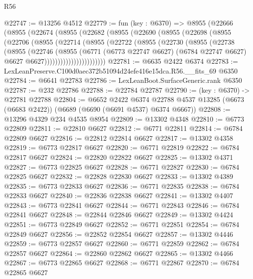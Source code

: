 \begin{lexlean}{R56}
\begin{coremodule}
@22747 := @13256 @4512
@22779 := fun (key : @6370) =>
  @8955
    (@22666
      (@8955
        (@22674
          (@8955
            (@22682
              (@8955
                (@22690
                  (@8955
                    (@22698
                      (@8955
                        (@22706
                          (@8955
                            (@22714
                              (@8955
                                (@22722
                                  (@8955
                                    (@22730
                                      (@8955
                                        (@22738
                                          (@8955
                                            (@22746
                                              (@8955
                                                (@6771
                                                  (@6773 @22747 @6627)
                                                  (@6784 @22747 @6627)
                                                  @6627
                                                  @6627)))))))))))))))))))))))
@22781 := @6635 @2422 @6374
@22783 := LexLeanPreserve.C100d0aec372b51094d24efe416e15dca.R56.__fits_69 @6350
@22784 := @6641 @22783
@22786 := LexLeanBoot.SurfaceGeneric.rank @6350
@22787 := @232 @22786
@22788 := @22784 @22787
@22790 := (key : @6370) -> @22781 @22788
@22804 := @6652
    @2422
    @6374
    @22788
    @4537
    @13285
    (@6673 (@6683 @2422))
    (@6689 (@6690 (@6691 @4537) @6374 @6667))
@22808 := @13296 @4329 @234 @4535 @8954
@22809 := @13302 @4348
@22810 := @6773 @22809
@22811 := @22810 @6627
@22812 := @6771 @22811
@22814 := @6784 @22809 @6627
@22816 := @22812 @22814 @6627
@22817 := @13302 @4358
@22819 := @6773 @22817 @6627
@22820 := @6771 @22819
@22822 := @6784 @22817 @6627
@22824 := @22820 @22822 @6627
@22825 := @13302 @4371
@22827 := @6773 @22825 @6627
@22828 := @6771 @22827
@22830 := @6784 @22825 @6627
@22832 := @22828 @22830 @6627
@22833 := @13302 @4389
@22835 := @6773 @22833 @6627
@22836 := @6771 @22835
@22838 := @6784 @22833 @6627
@22840 := @22836 @22838 @6627
@22841 := @13302 @4407
@22843 := @6773 @22841 @6627
@22844 := @6771 @22843
@22846 := @6784 @22841 @6627
@22848 := @22844 @22846 @6627
@22849 := @13302 @4424
@22851 := @6773 @22849 @6627
@22852 := @6771 @22851
@22854 := @6784 @22849 @6627
@22856 := @22852 @22854 @6627
@22857 := @13302 @4446
@22859 := @6773 @22857 @6627
@22860 := @6771 @22859
@22862 := @6784 @22857 @6627
@22864 := @22860 @22862 @6627
@22865 := @13302 @4466
@22867 := @6773 @22865 @6627
@22868 := @6771 @22867
@22870 := @6784 @22865 @6627

\end{coremodule}
\end{lexlean}
